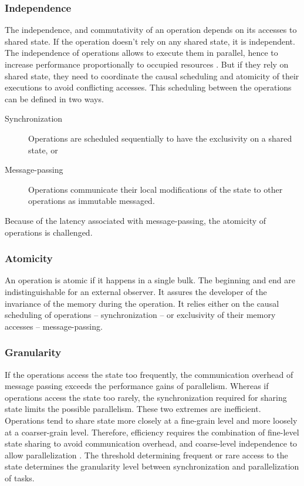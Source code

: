 \subsubsection{Independence} \label{chapter3:definitions:efficiency:independence}

The independence, and commutativity of an operation depends on its accesses to shared state.
If the operation doesn't rely on any shared state, it is independent.
The independence of operations allows to execute them in parallel, hence to increase performance proportionally to occupied resources \cite{Amdahl1967,Gunther1993}.
But if they rely on shared state, they need to coordinate the causal scheduling and atomicity of their executions to avoid conflicting accesses.
This scheduling between the operations can be defined in two ways.
\begin{description}
\item[Synchronization] Operations are scheduled sequentially to have the exclusivity on a shared state, or
\item[Message-passing] Operations communicate their local modifications of the state to other operations as immutable messaged.
\end{description}

Because of the latency associated with message-passing, the atomicity of operations is challenged.

\subsubsection{Atomicity} \label{chapter3:definitions:efficiency:atomicity}

An operation is atomic if it happens in a single bulk.
The beginning and end are indistinguishable for an external observer.
It assures the developer of the invariance of the memory during the operation.
It relies either on the causal scheduling of operations -- synchronization -- or exclusivity of their memory accesses -- message-passing.

\subsubsection{Granularity} \label{chapter3:definitions:efficiency:granularity}

If the operations access the state too frequently, the communication overhead of message passing exceeds the performance gains of parallelism.
Whereas if operations access the state too rarely, the synchronization required for sharing state limits the possible parallelism.
These two extremes are inefficient.
Operations tend to share state more closely at a fine-grain level and more loosely at a coarser-grain level.
Therefore, efficiency requires the combination of fine-level state sharing to avoid communication overhead, and coarse-level independence to allow parallelization \cite{Gustafson1988,Gunther1996,Nelson1996,Gunther2002}.
The threshold determining frequent or rare access to the state determines the granularity level between synchronization and parallelization of tasks.

